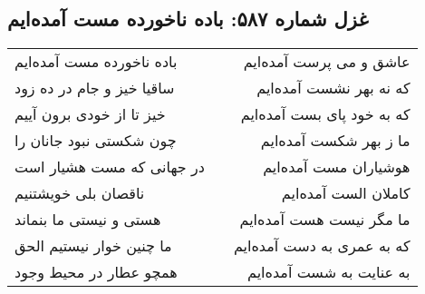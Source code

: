 \begin{center}
\section*{غزل شماره ۵۸۷: باده ناخورده مست آمده‌ایم}
\label{sec:587}
\begin{longtable}{l p{0.5cm} r}
باده ناخورده مست آمده‌ایم
&&
عاشق و می پرست آمده‌ایم
\\
ساقیا خیز و جام در ده زود
&&
که نه بهر نشست آمده‌ایم
\\
خیز تا از خودی برون آییم
&&
که به خود پای بست آمده‌ایم
\\
چون شکستی نبود جانان را
&&
ما ز بهر شکست آمده‌ایم
\\
در جهانی که مست هشیار است
&&
هوشیاران مست آمده‌ایم
\\
ناقصان بلی خویشتنیم
&&
کاملان الست آمده‌ایم
\\
هستی و نیستی ما بنماند
&&
ما مگر نیست هست آمده‌ایم
\\
ما چنین خوار نیستیم الحق
&&
که به عمری به دست آمده‌ایم
\\
همچو عطار در محیط وجود
&&
به عنایت به شست آمده‌ایم
\\
\end{longtable}
\end{center}
